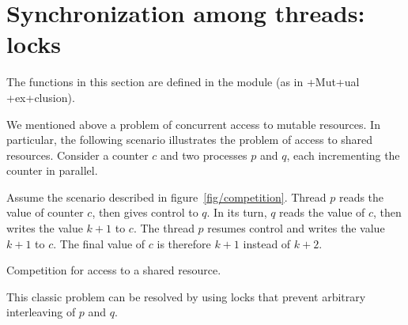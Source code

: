 \section{Synchronization among threads: locks}
The functions in this section are defined in the
 module (as in \ml+Mut+ual \ml+ex+clusion).\medskip

We mentioned above a problem of concurrent access to mutable
resources. In particular, the following scenario illustrates the
problem of access to shared resources.  Consider a counter $c$ and two
processes $p$ and $q$, each incrementing the counter in parallel.

Assume the scenario described in figure~\ref {fig/competition}.
Thread $p$ reads the value of counter $c$, then gives control to $q$.
In its turn, $q$ reads the value of $c$, then writes the value $k+1$
to $c$.  The thread $p$ resumes control and writes the value $k+1$ to
$c$. The final value of $c$ is therefore $k+1$ instead of $k+2$.

\begin{myfigure}
\begin{myimage}[width="100\%"]
\end{myimage}
\caption {Competition for access to a shared resource.}
\label{fig/competition}
\end{myfigure}

This classic problem can be resolved by using locks that
prevent arbitrary interleaving of $p$ and $q$.

